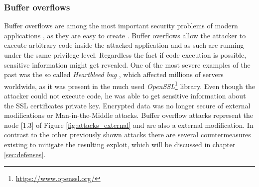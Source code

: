 \subsubsection{Buffer overflows}
Buffer overflows are among the most important security problems of modern applications \cite{pethia}, as they are easy to create \cite{bufferoverflows_easy}. Buffer overflows allow the attacker to execute arbitrary code inside the attacked application and as such are running under the same privilege level. Regardless the fact if code execution is possible, sensitive information might get revealed. One of the most severe examples of the past was the so called \emph{Heartbleed bug} \cite{durumeri}, which affected millions of servers worldwide, as it was present in the much used \emph{OpenSSL}\footnote{\url{https://www.openssl.org/}} library. Even though the attacker could not execute code, he was able to get sensitive information about the SSL certificates private key. Encrypted data was no longer secure of external modifications or Man-in-the-Middle attacks. Buffer overflow attacks represent the node [1.3] of Figure \ref{fig:attacks_external} and are also a external modification. In contrast to the other previously shown attacks there are several countermeasures existing to mitigate the resulting exploit, which will be discussed in chapter \ref{sec:defenses}.